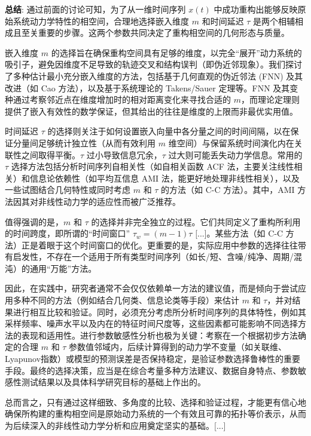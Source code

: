 \textbf{总结}: 通过前面的讨论可知，为了从一维时间序列 $x(t)$ 中成功重构出能够反映原始系统动力学特性的相空间，合理地选择嵌入维度 $m$ 和时间延迟 $\tau$ 是两个相辅相成且至关重要的步骤。这两个参数共同决定了重构相空间的几何形态与质量。

嵌入维度 $m$ 的选择旨在确保重构空间具有足够的维度，以完全“展开”动力系统的吸引子，避免因维度不足导致的轨迹交叉和结构误判（即伪近邻现象）。我们探讨了多种估计最小充分嵌入维度的方法，包括基于几何直观的伪近邻法 (FNN) 及其改进（如 Cao 方法），以及基于系统理论的 Takens/Sauer 定理等。FNN 及其变种通过考察邻近点在维度增加时的相对距离变化来寻找合适的 $m$，而理论定理则提供了嵌入有效性的数学保证，但其给出的往往是维度的上限而非最优实用值。

时间延迟 $\tau$ 的选择则关注于如何设置嵌入向量中各分量之间的时间间隔，以在保证分量间足够统计独立性（从而有效利用 $m$ 维空间）与保留系统时间演化内在关联性之间取得平衡。$\tau$ 过小导致信息冗余，$\tau$ 过大则可能丢失动力学信息。常用的 $\tau$ 选择方法包括分析时间序列自相关性（如自相关函数 ACF 法，主要关注线性相关）和信息论依赖性（如平均互信息 AMI 法，能更好地处理非线性相关），以及一些试图结合几何特性或同时考虑 $m$ 和 $\tau$ 的方法（如 C-C 方法）。其中，AMI 方法因其对非线性动力学的适应性而被广泛推荐。

值得强调的是，$m$ 和 $\tau$ 的选择并非完全独立的过程。它们共同定义了重构所利用的时间跨度，即所谓的“时间窗口” $\tau_w = (m-1)\tau$ [...]。某些方法（如 C-C 方法）正是着眼于这个时间窗口的优化。更重要的是，实际应用中参数的选择往往带有启发性，不存在一个适用于所有类型时间序列（如长/短、含噪/纯净、周期/混沌）的通用“万能”方法。

因此，在实践中，研究者通常不会仅仅依赖单一方法的建议值，而是倾向于尝试应用多种不同的方法（例如结合几何类、信息论类等手段）来估计 $m$ 和 $\tau$，并对结果进行相互比较和验证。同时，必须充分考虑所分析时间序列的具体特性，例如其采样频率、噪声水平以及内在的特征时间尺度等，这些因素都可能影响不同选择方法的表现和适用性。进行参数敏感性分析也极为关键：考察在一个根据初步方法确定的合理 $m$ 和 $\tau$ 参数值邻域内，后续计算得到的动力学不变量（如关联维、Lyapunov指数）或模型的预测误差是否保持稳定，是验证参数选择鲁棒性的重要手段。最终的选择决策，应当是在综合考量多种方法建议、数据自身特点、参数敏感性测试结果以及具体科学研究目标的基础上作出的。

总而言之，只有通过这样细致、多角度的比较、选择和验证过程，才能更有信心地确保所构建的重构相空间是原始动力系统的一个有效且可靠的拓扑等价表示，从而为后续深入的非线性动力学分析和应用奠定坚实的基础。[...]



